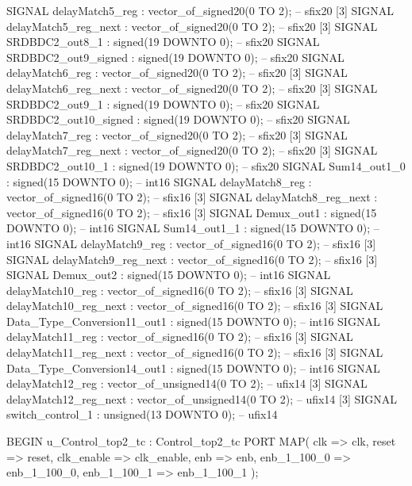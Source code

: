 \begin{mylisting}[language=VHDL,caption=MSSRDCDB制御\&SVPWMモジュール,label=appF_Control_top2_module_VHDL]
  SIGNAL delayMatch5_reg                  : vector_of_signed20(0 TO 2);  -- sfix20 [3]
  SIGNAL delayMatch5_reg_next             : vector_of_signed20(0 TO 2);  -- sfix20 [3]
  SIGNAL SRDBDC2_out8_1                   : signed(19 DOWNTO 0);  -- sfix20
  SIGNAL SRDBDC2_out9_signed              : signed(19 DOWNTO 0);  -- sfix20
  SIGNAL delayMatch6_reg                  : vector_of_signed20(0 TO 2);  -- sfix20 [3]
  SIGNAL delayMatch6_reg_next             : vector_of_signed20(0 TO 2);  -- sfix20 [3]
  SIGNAL SRDBDC2_out9_1                   : signed(19 DOWNTO 0);  -- sfix20
  SIGNAL SRDBDC2_out10_signed             : signed(19 DOWNTO 0);  -- sfix20
  SIGNAL delayMatch7_reg                  : vector_of_signed20(0 TO 2);  -- sfix20 [3]
  SIGNAL delayMatch7_reg_next             : vector_of_signed20(0 TO 2);  -- sfix20 [3]
  SIGNAL SRDBDC2_out10_1                  : signed(19 DOWNTO 0);  -- sfix20
  SIGNAL Sum14_out1_0                     : signed(15 DOWNTO 0);  -- int16
  SIGNAL delayMatch8_reg                  : vector_of_signed16(0 TO 2);  -- sfix16 [3]
  SIGNAL delayMatch8_reg_next             : vector_of_signed16(0 TO 2);  -- sfix16 [3]
  SIGNAL Demux_out1                       : signed(15 DOWNTO 0);  -- int16
  SIGNAL Sum14_out1_1                     : signed(15 DOWNTO 0);  -- int16
  SIGNAL delayMatch9_reg                  : vector_of_signed16(0 TO 2);  -- sfix16 [3]
  SIGNAL delayMatch9_reg_next             : vector_of_signed16(0 TO 2);  -- sfix16 [3]
  SIGNAL Demux_out2                       : signed(15 DOWNTO 0);  -- int16
  SIGNAL delayMatch10_reg                 : vector_of_signed16(0 TO 2);  -- sfix16 [3]
  SIGNAL delayMatch10_reg_next            : vector_of_signed16(0 TO 2);  -- sfix16 [3]
  SIGNAL Data_Type_Conversion11_out1      : signed(15 DOWNTO 0);  -- int16
  SIGNAL delayMatch11_reg                 : vector_of_signed16(0 TO 2);  -- sfix16 [3]
  SIGNAL delayMatch11_reg_next            : vector_of_signed16(0 TO 2);  -- sfix16 [3]
  SIGNAL Data_Type_Conversion14_out1      : signed(15 DOWNTO 0);  -- int16
  SIGNAL delayMatch12_reg                 : vector_of_unsigned14(0 TO 2);  -- ufix14 [3]
  SIGNAL delayMatch12_reg_next            : vector_of_unsigned14(0 TO 2);  -- ufix14 [3]
  SIGNAL switch_control_1                 : unsigned(13 DOWNTO 0);  -- ufix14

BEGIN
  u_Control_top2_tc : Control_top2_tc
    PORT MAP( clk => clk,
              reset => reset,
              clk_enable => clk_enable,
              enb => enb,
              enb_1_100_0 => enb_1_100_0,
              enb_1_100_1 => enb_1_100_1
              );


\end{mylisting}
